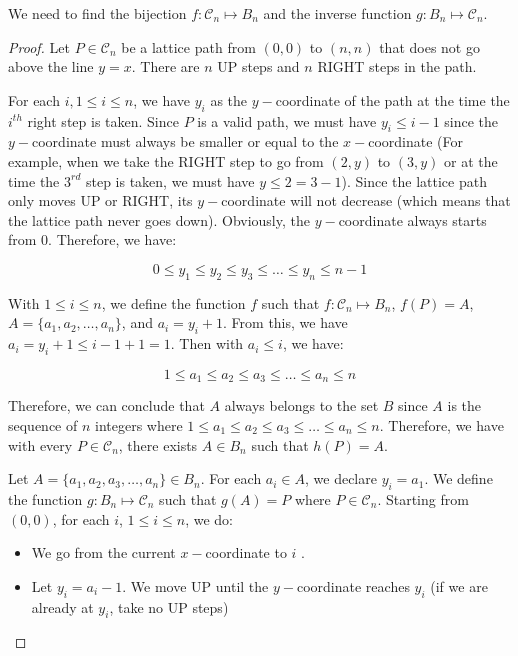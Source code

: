 \documentclass[10pt]{article}
\begin{document}
\begin{enumerate}
We need to find the bijection $f: \mathcal{C}_n \mapsto B_n$ and the inverse function $g: B_n \mapsto \mathcal{C}_n $.

\begin{proof}
    Let $P \in \mathcal{C}_n $ be a lattice path from $(0,0)$ to $(n,n)$ that does not go above the line $y=x$. There are $n$ UP steps and $n$ RIGHT steps in the path.
    
    For each $i, 1 \leq i \leq n$, we have $y_i$ as the $y-$coordinate of the path at the time the $i^{th}$ right step is taken. Since $P$ is a valid path, we must have $y_i \leq i - 1$ since the $y-$coordinate must always be smaller or equal to the $x-$coordinate (For example, when we take the RIGHT step to go from $(2,y)$ to $(3,y)$ or at the time the $3^{rd}$ step is taken, we must have $y \leq 2 = 3 - 1$). Since the lattice path only moves UP or RIGHT, its $y-$coordinate will not decrease (which means that the lattice path never goes down). Obviously, the $y-$coordinate always starts from $0$. Therefore, we have:
    
    $$0 \leq y_1 \leq y_2 \leq y_3 \leq \ldots \leq y_n \leq n - 1$$
    
    With $1 \leq i \leq n$, we define the function $f$ such that $f: \mathcal{C}_n  \mapsto B_n$, $f(P) = A$, $A = \{a_1,a_2,\ldots, a_n\}$, and $a_i = y_i+1$. From this, we have $a_i=y_i+1\leq i - 1 + 1 = 1$. Then with $a_i \leq i$, we have:
    
    $$1 \leq a_1 \leq a_2 \leq a_3 \leq \ldots \leq a_n \leq n$$

    Therefore, we can conclude that $A$ always belongs to the set $B$ since $A$ is the sequence of $n$ integers where $1 \leq a_1 \leq a_2 \leq a_3 \leq \ldots \leq a_n \leq n$. Therefore, we have with every $P \in \mathcal{C}_n$, there exists $A \in B_n$ such that $h(P) = A$.

    Let $A = \{a_1,a_2,a_3,\ldots,a_n\} \in B_n$. For each $a_i \in A$, we declare $y_i = a_1$. We define the function $g:B_n \mapsto \mathcal{C}_n$ such that $g(A) = P$ where $P \in \mathcal{C}_n$. Starting from $(0,0)$, for each $i$, $1 \leq i \leq n$, we do:

\begin{itemize}
    \item We go from the current $x-$coordinate to $i$ .
    \item Let $y_i = a_i-1$. We move UP until the $y-$coordinate reaches $y_i$ (if we are already at $y_i$, take no UP steps)
\end{itemize}


\end{proof}
\end{enumerate}
\end{document}
